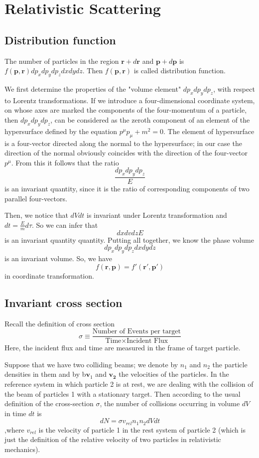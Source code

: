 \documentclass[cyan]{elegantnote}
\begin{document}
\section{Relativistic Scattering}
\subsection{Distribution function}
The number of particles in the region $\bm{r}+d\bm{r}$ and $\bm{p} + d\bm{p}$ is $f(\bm{p},\bm{r})dp_x dp_y dp_z dx dy dz$. Then  $f(\bm{p},\bm{r})$ is called distribution function.

We first determine the properties of the "volume element" $dp_x dp_y dp_z$, with respect to Lorentz transformations. If we introduce a four-dimensional coordinate system, on whose axes are marked the components of the four-momentum of a particle, then $dp_x dp_y dp_z$, can be considered as the zeroth component of an element of the hypersurface defined by the equation $p^{\mu}p_{\mu} + m^2 = 0$. The element of hypersurface is a four-vector directed along the normal to the hypersurface; in our case the direction of the normal obviously coincides with the direction of the four-vector $p^{\mu}$. From this it follows that the ratio
\[\frac{dp_x dp_y dp_z}{E}\]
is an invariant quantity, since it is the ratio of corresponding components of two parallel four-vectors.

Then, we notice that $dVdt$ is invariant under Lorentz transformation and $dt = \frac{E}{m} d\tau $. So we can infer that
\[dx dv dz E\]
is an invariant quantity quantity. Putting all together, we know the phase volume
\[dp_x dp_y dp_z dx dy dz\]
is an invariant volume. So, we have
\[f(\bm{r},\bm{p}) = f'(\bm{r}',\bm{p}')\]
in coordinate transformation.

\subsection{Invariant cross section}
Recall the definition of cross section
\[\sigma \equiv \frac{\mbox{Number of Events per target}}{\mbox{Time} \times \mbox{Incident Flux}}\]
Here, the incident flux and time are measured in the frame of target particle.

Suppose that we have two colliding beams; we denote by $n_1$ and $n_2$ the particle densities in them and by b$\bm{v}_1$ and $\bm{v_2}$ the velocities of the particles. In the reference system in which particle 2 is at rest, we are dealing with the collision of the beam of particles 1 with a stationary target. Then according to the usual definition of the cross-section $\sigma$, the number of collisions occurring in volume $dV$ in time $dt$ is 
\[dN = \sigma v_{rel} n_1 n_2 dV dt\]
,where $v_{rel}$ is the velocity of particle 1 in the rest system of particle 2 (which is just the definition of the relative velocity of two particles in relativistic mechanics). 
\end{document}
